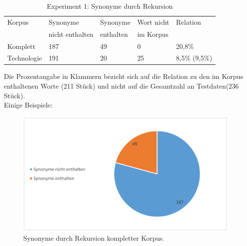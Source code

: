 \documentclass[12pt,a4paper]{report}
\begin{document}
\begin{table}[h]
\caption{Experiment 1: Synonyme durch Rekursion}
\begin{center}
\begin{tabular}{|l||l|l|l|l|}
\hline
Korpus & Synonyme & Synonyme  & Wort nicht  & Relation\\
 & nicht enthalten & enthalten & im Korpus & \\

\hline
 Komplett & 187 & 49 & 0 & 20,8\% \\
 \hline
 Technologie & 191 & 20 & 25 & 8,5\% (9,5\%)\\
 \hline
 
\end{tabular}
\end{center}
\end{table}
		Die Prozentangabe in Klammern bezieht sich auf die Relation zu den im Korpus enthaltenen Worte (211 Stück) und nicht auf die Gesamtzahl an Testdaten(236 Stück).\\
		
Einige Beispiele:\\
 
		
\begin{figure}[p]
  \begin{center}
	\includegraphics[scale=0.4]{SynonymFull.PNG}
  \end{center}  
  \caption{Synonyme durch Rekursion kompletter Korpus.}

\end{figure}
 
\end{document}
